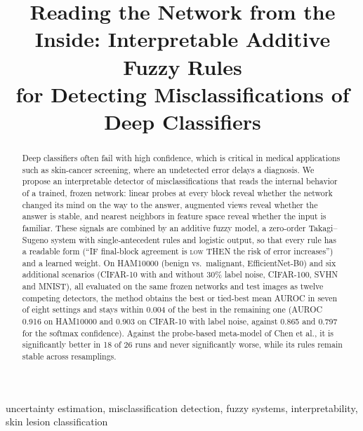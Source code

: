 \documentclass[conference,a4paper]{IEEEtran}
\newcommand{\term}[1]{\textsc{#1}}
\begin{document}
\title{Reading the Network from the Inside: Interpretable Additive Fuzzy Rules\\
for Detecting Misclassifications of Deep Classifiers}

\author{}

\maketitle

\begin{abstract}
Deep classifiers often fail with high confidence, which is critical in medical applications such as skin-cancer screening,
where an undetected error delays a diagnosis.
We propose an interpretable detector of misclassifications that reads the internal behavior of a trained, frozen network:
linear probes at every block reveal whether the network changed its mind on the way to the answer,
augmented views reveal whether the answer is stable, and nearest neighbors in feature space reveal whether the input is familiar.
These signals are combined by an additive fuzzy model, a zero-order Takagi--Sugeno system with single-antecedent rules and logistic output,
so that every rule has a readable form (``IF final-block agreement is \term{low} THEN the risk of error increases'') and a learned weight.
On HAM10000 (benign vs.\ malignant, EfficientNet-B0) and six additional scenarios (CIFAR-10 with and without 30\% label noise,
CIFAR-100, SVHN and MNIST), all evaluated on the same frozen networks and test images as twelve competing detectors,
the method obtains the best or tied-best mean AUROC in seven of eight settings and stays within 0.004 of the best in the remaining one
(AUROC 0.916 on HAM10000 and 0.903 on CIFAR-10 with label noise, against 0.865 and 0.797 for the softmax confidence).
Against the probe-based meta-model of Chen et al., it is significantly better in 18 of 26 runs and never significantly worse,
while its rules remain stable across resamplings.
\end{abstract}

\begin{IEEEkeywords}
uncertainty estimation, misclassification detection, fuzzy systems, interpretability, skin lesion classification
\end{IEEEkeywords}
\end{document}
